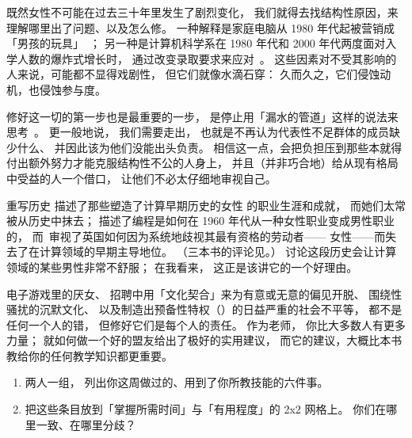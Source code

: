 既然女性不可能在过去三十年里发生了剧烈变化，
我们就得去找结构性原因，来理解哪里出了问题、以及怎么修。
一种解释是家庭电脑从 1980 年代起被营销成「男孩的玩具」~\cite{Marg2003}；
另一种是计算机科学系在 1980 年代和 2000 年代两度面对入学人数的爆炸式增长时，
通过改变录取要求来应对~\cite{Robe2017}。
这些因素对不受其影响的人来说，可能都不显得戏剧性，
但它们就像水滴石穿：
久而久之，它们侵蚀动机，也侵蚀参与度。

修好这一切的第一步也是最重要的一步，
是停止用「漏水的管道」这样的说法来思考~\cite{Mill2015}。
更一般地说，
我们需要走出，
也就是不再认为代表性不足群体的成员缺少什么、
并因此该为他们没能出头负责。
相信这一点，会把负担压到那些本就得付出额外努力才能克服结构性不公的人身上，
并且（并非巧合地）给从现有格局中受益的人一个借口，
让他们不必太仔细地审视自己。

\begin{aside}{重写历史}
  \cite{Abba2012}描述了那些塑造了计算早期历史的女性
  的职业生涯和成就，
  而她们太常被从历史中抹去；
  \cite{Ensm2003,Ensm2012}描述了编程是如何在 1960 年代从一种女性职业变成男性职业的，
  而~\cite{Hick2018}审视了英国如何因为系统地歧视其最有资格的劳动者——
  女性——而失去了在计算领域的早期主导地位。
  （三本书的评论见\cite{Milt2018}。）
  讨论这段历史会让计算领域的某些男性非常不舒服；
  在我看来，
  这正是该讲它的一个好理由。
\end{aside}

电子游戏里的厌女、
招聘中用「文化契合」来为有意或无意的偏见开脱、
围绕性骚扰的沉默文化、
以及制造出预备性特权（）的日益严重的社会不平等，
都不是任何一个人的错，
但修好它们是每个人的责任。
作为老师，
你比大多数人有更多力量；
就如何做一个好的盟友给出了极好的实用建议，
而它的建议，大概比本书教给你的任何教学知识都更重要。



\begin{enumerate}

\item
  两人一组，
  列出你这周做过的、用到了你所教技能的六件事。

\item
  把这些条目放到「掌握所需时间」与「有用程度」的 2x2 网格上。
  你们在哪里一致、在哪里分歧？

\end{enumerate}


